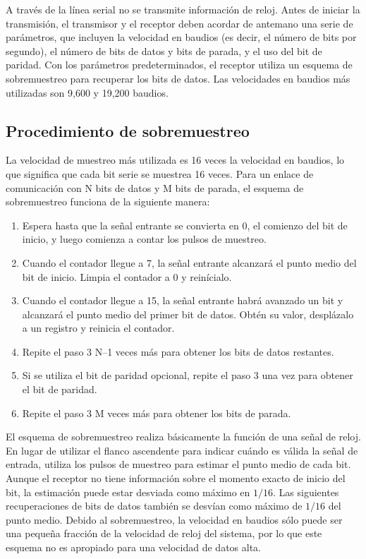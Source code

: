     A través de la línea serial no se transmite información de reloj. Antes de iniciar la transmisión, el transmisor y el receptor deben acordar de antemano una serie de parámetros, que incluyen la velocidad en baudios (es decir, el número de bits por segundo), el número de bits de datos y bits de parada, y el uso del bit de paridad. Con los parámetros predeterminados, el receptor utiliza un esquema de sobremuestreo para recuperar los bits de datos. Las velocidades en baudios más utilizadas son 9,600 y 19,200 baudios.

    \subsection{Procedimiento de sobremuestreo}

    La velocidad de muestreo más utilizada es 16 veces la velocidad en baudios, lo que significa que cada bit serie se muestrea 16 veces. Para un enlace de comunicación con N bits de datos y M bits de parada, el esquema de sobremuestreo funciona de la siguiente manera:
    
    \begin{enumerate}
      \item Espera hasta que la señal entrante se convierta en 0, el comienzo del bit de inicio, y luego comienza a contar los pulsos de muestreo.
      \item Cuando el contador llegue a 7, la señal entrante alcanzará el punto medio del bit de inicio. Limpia el contador a 0 y reinícialo.
      \item Cuando el contador llegue a 15, la señal entrante habrá avanzado un bit y alcanzará el punto medio del primer bit de datos. Obtén su valor, desplázalo a un registro y reinicia el contador.
      \item Repite el paso 3 N–1 veces más para obtener los bits de datos restantes.
      \item Si se utiliza el bit de paridad opcional, repite el paso 3 una vez para obtener el bit de paridad.
      \item Repite el paso 3 M veces más para obtener los bits de parada.
    \end{enumerate}

    El esquema de sobremuestreo realiza básicamente la función de una señal de reloj. En lugar de utilizar el flanco ascendente para indicar cuándo es válida la señal de entrada, utiliza los pulsos de muestreo para estimar el punto medio de cada bit. Aunque el receptor no tiene información sobre el momento exacto de inicio del bit, la estimación puede estar desviada como máximo en $1/16$. Las siguientes recuperaciones de bits de datos también se desvían como máximo de $1/16$ del punto medio. Debido al sobremuestreo, la velocidad en baudios sólo puede ser una pequeña fracción de la velocidad de reloj del sistema, por lo que este esquema no es apropiado para una velocidad de datos alta.


